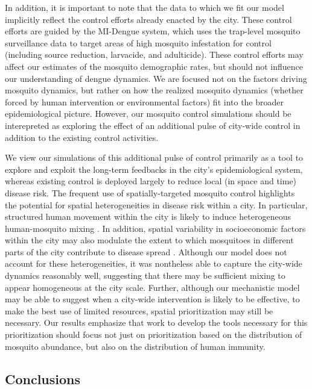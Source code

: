 \documentclass[10pt,letterpaper]{article}
\begin{document}
In addition, it is important to note that the data to which we fit our model implicitly reflect the control efforts already enacted by the city.
These control efforts are guided by the MI-Dengue system, which uses the trap-level mosquito surveillance data to target areas of high mosquito infestation for control (including source reduction, larvacide, and adulticide)\cite{Eiras2009}.
These control efforts may affect our estimates of the mosquito demographic rates, but should not influence our understanding of dengue dynamics.
We are focused not on the factors driving mosquito dynamics, but rather on how the realized mosquito dynamics (whether forced by human intervention or environmental factors) fit into the broader epidemiological picture.
However, our mosquito control simulations should be interepreted as exploring the effect of an additional pulse of city-wide control in addition to the existing control activities.

We view our simulations of this additional pulse of control primarily as a tool to explore and exploit the long-term feedbacks in the city's epidemiological system, whereas existing control is deployed largely to reduce local (in space and time) disease risk.
The frequent use of spatially-targeted mosquito control highlights the potential for spatial heterogeneities in disease risk within a city.
In particular, structured human movement within the city is likely to induce heterogeneous human-mosquito mixing \cite{Adams2009, Cosner2009a, Stoddard2009}.
In addition, spatial variability in socioeconomic factors within the city may also modulate the extent to which mosquitoes in different parts of the city contribute to disease spread \cite{Mondini2008, Honorio2009, Hu2012, DeMattosAlmeida2007}.
Although our model does not account for these heterogeneities, it was nontheless able to capture the city-wide dynamics reasonably well, suggesting that there may be sufficient mixing to appear homogeneous at the city scale.
Further, although our mechanistic model may be able to suggest when a city-wide intervention is likely to be effective, to make the best use of limited resources, spatial prioritization may still be necessary.
Our results emphasize that work to develop the tools necessary for this prioritization should focus not just on prioritization based on the distribution of mosquito abundance, but also on the distribution of human immunity.

\subsection*{Conclusions}
\end{document}
